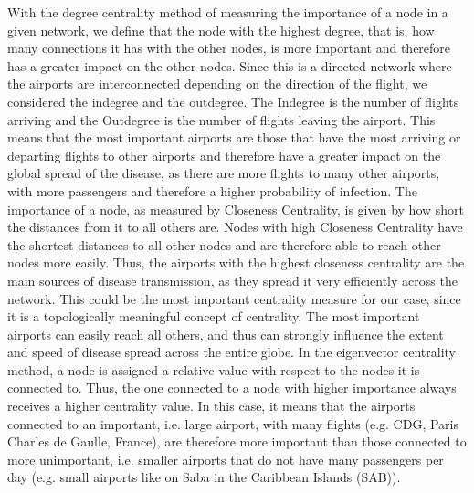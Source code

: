 \documentclass{Template resources/netsci-project}
\begin{document}
With the degree centrality method of measuring the importance of a node in a given network, we define that the node with the highest degree, that is, how many connections it has with the other nodes, is more important and therefore has a greater impact on the other nodes. Since this is a directed network where the airports are interconnected depending on the direction of the flight, we considered the indegree and the outdegree. The Indegree is the number of flights arriving and the Outdegree is the number of flights leaving the airport. This means that the most important airports are those that have the most arriving or departing flights to other airports and therefore have a greater impact on the global spread of the disease, as there are more flights to many other airports, with more passengers and therefore a higher probability of infection.
The importance of a node, as measured by Closeness Centrality, is given by how short the distances from it to all others are. Nodes with high Closeness Centrality have the shortest distances to all other nodes and are therefore able to reach other nodes more easily. Thus, the airports with the highest closeness centrality are the main sources of disease transmission, as they spread it very efficiently across the network. This could be the most important centrality measure for our case, since it is a topologically meaningful concept of centrality. The most important airports can easily reach all others, and thus can strongly influence the extent and speed of disease spread across the entire globe.
In the eigenvector centrality method, a node is assigned a relative value with respect to the nodes it is connected to. Thus, the one connected to a node with higher importance always receives a higher centrality value. In this case, it means that the airports connected to an important, i.e. large airport, with many flights (e.g. CDG, Paris Charles de Gaulle, France), are therefore more important than those connected to more unimportant, i.e. smaller airports that do not have many passengers per day (e.g. small airports like on Saba in the Caribbean Islands (SAB)).
\end{document}
